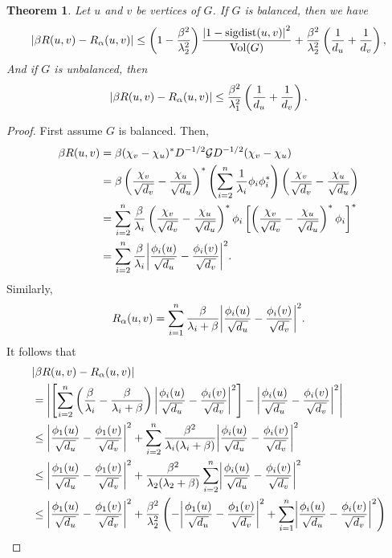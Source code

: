 \documentclass[12pt]{article}
\newtheorem{thm}{Theorem}
\theoremstyle{definition}
\DeclarePairedDelimiter\abs{\lvert}{\rvert}
\DeclareMathOperator{\sigdist}{sigdist}
\DeclareMathOperator{\vol}{Vol}
\newcommand{\green}{\mathcal{G}}
\begin{document}
\begin{thm}
Let $u$ and $v$ be vertices of $G$. If $G$ is balanced, then we have
$$
\abs*{\beta R(u, v) - R_\alpha (u, v)}
\leq \left( 1 - \frac{\beta^2}{\lambda_2^2} \right) \frac{\abs*{1 - \sigdist(u, v)}^2}{\vol(G)} + \frac{\beta^2}{\lambda_2^2}\left( \frac{1}{d_u} + \frac{1}{d_v} \right),
$$
And if $G$ is unbalanced, then
$$
\abs*{\beta R(u, v) - R_\alpha (u, v)}
\leq \frac{\beta^2}{\lambda_1^2}\left( \frac{1}{d_u} + \frac{1}{d_v} \right).
$$
\end{thm}
\begin{proof}
First assume $G$ is balanced. Then,
\begin{align*}
\beta R(u, v) 
&= \beta (\chi_v - \chi_u)^* D^{-1/2} \green D^{-1/2} (\chi_v - \chi_u) \\
&= \beta \left( \frac{\chi_v}{\sqrt{d_v}} - \frac{\chi_u}{\sqrt{d_u}} \right)^* \left( \sum_{i=2}^n \frac{1}{\lambda_i} \phi_i \phi_i^* \right) \left( \frac{\chi_v}{\sqrt{d_v}} - \frac{\chi_u}{\sqrt{d_u}} \right) \\
&= \sum_{i=2}^n \frac{\beta}{\lambda_i} \left( \frac{\chi_v}{\sqrt{d_v}} - \frac{\chi_u}{\sqrt{d_u}} \right)^* \phi_i \left[ \left( \frac{\chi_v}{\sqrt{d_v}} - \frac{\chi_u}{\sqrt{d_u}} \right)^* \phi_i \right]^* \\
&= \sum_{i=2}^n \frac{\beta}{\lambda_i} \abs*{\frac{\phi_i(u)}{\sqrt{d_u}} - \frac{\phi_i(v)}{\sqrt{d_v}}}^2.
\end{align*}
Similarly,
$$
R_\alpha(u, v) = \sum_{i=1}^n \frac{\beta}{\lambda_i + \beta} \abs*{\frac{\phi_i(u)}{\sqrt{d_u}} - \frac{\phi_i(v)}{\sqrt{d_v}}}^2.
$$
It follows that
\begin{align*}
&\abs*{\beta R(u, v) - R_\alpha (u, v)} \\
&= \abs*{\left[ \sum_{i=2}^n \left( \frac{\beta}{\lambda_i} - \frac{\beta}{\lambda_i + \beta} \right) \abs*{\frac{\phi_i(u)}{\sqrt{d_u}} - \frac{\phi_i(v)}{\sqrt{d_v}}}^2 \right] - \abs*{\frac{\phi_i(u)}{\sqrt{d_u}} - \frac{\phi_i(v)}{\sqrt{d_v}}}^2} \\
&\leq \abs*{\frac{\phi_1(u)}{\sqrt{d_u}} - \frac{\phi_1(v)}{\sqrt{d_v}}}^2 + \sum_{i=2}^n \frac{\beta^2}{\lambda_i(\lambda_i + \beta)} \abs*{\frac{\phi_i(u)}{\sqrt{d_u}} - \frac{\phi_i(v)}{\sqrt{d_v}}}^2 \\
&\leq \abs*{\frac{\phi_1(u)}{\sqrt{d_u}} - \frac{\phi_1(v)}{\sqrt{d_v}}}^2 + \frac{\beta^2}{\lambda_2(\lambda_2 + \beta)} \sum_{i=2}^n \abs*{\frac{\phi_i(u)}{\sqrt{d_u}} - \frac{\phi_i(v)}{\sqrt{d_v}}}^2 \\
&\leq \abs*{\frac{\phi_1(u)}{\sqrt{d_u}} - \frac{\phi_1(v)}{\sqrt{d_v}}}^2 + \frac{\beta^2}{\lambda_2^2} \left( -\abs*{\frac{\phi_1(u)}{\sqrt{d_u}} - \frac{\phi_1(v)}{\sqrt{d_v}}}^2 + \sum_{i=1}^n \abs*{\frac{\phi_i(u)}{\sqrt{d_u}} - \frac{\phi_i(v)}{\sqrt{d_v}}}^2 \right) \\

\end{align*}
\end{proof}
\end{document}
